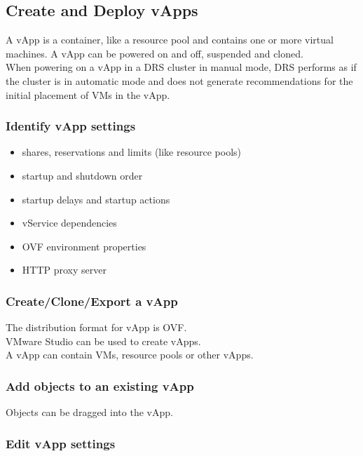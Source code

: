 \subsection{Create and Deploy vApps}

A vApp is a container, like a resource pool and contains one or more virtual
machines. A vApp can be powered on and off, suspended and cloned.\\

When powering on a vApp in a DRS cluster in manual mode, DRS performs as if
the cluster is in automatic mode  and does not generate recommendations for
the initial placement of VMs in the vApp.

\subsubsection{Identify vApp settings}

\begin{itemize}
\item shares, reservations and limits (like resource pools)
\item startup and shutdown order
\item startup delays and startup actions
\item vService dependencies
\item OVF environment properties
\item HTTP proxy server
\end{itemize}

\subsubsection{Create/Clone/Export a vApp}

The distribution format for vApp is OVF.\\

VMware Studio can be used to create vApps.\\

A vApp can contain VMs, resource pools or other vApps.

\subsubsection{Add objects to an existing vApp}

Objects can be dragged into the vApp.

\subsubsection{Edit vApp settings}

